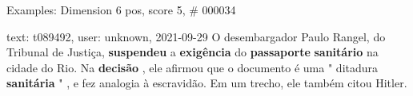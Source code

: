 \begin{frame}{Examples: Dimension 6 pos, score 5, \# 000034}
\footnotesize
\begin{exampleblock}{text: t089492, user: unknown, 2021-09-29}
O desembargador Paulo Rangel, do Tribunal de Justiça, \textbf{suspendeu} a 
\textbf{exigência} do \textbf{passaporte} \textbf{sanitário} na cidade do Rio. 
Na \textbf{decisão} , ele afirmou que o documento é uma " ditadura 
\textbf{sanitária} " , e fez analogia à escravidão. Em um trecho, ele também 
citou Hitler. 
\end{exampleblock}
\end{frame}
